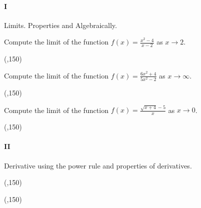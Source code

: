 
\paragraph{I} Limits. Properties and Algebraically. 

\begin{preguntas}

\pregunta[6] Compute the limit of the function \(f(x) = \frac{x^2 - 4}{x - 2}\) as $x\to2$. 

\begin{center}
    \framebox(\textwidth,150){}   
\end{center}

\pregunta[7] Compute the limit of the function \(f(x) = \frac{6x^2 + 4}{5x^2 - 2}\) as $x\to\infty$.

\begin{center}
    \framebox(\textwidth,150){} 
\end{center}

\newpage

\pregunta[7] Compute the limit of the function \(f(x) = \frac{\sqrt{x+4} - 5}{x}\) as $x\to0$.

\begin{center}
    \framebox(\textwidth,150){} 
\end{center}

\end{preguntas}


\paragraph{II} Derivative using the power rule and properties of derivatives.

\begin{preguntas}


\begin{center}
    \framebox(\textwidth,150){} 
\end{center}



\begin{center}
    \framebox(\textwidth,150){} 
\end{center}

\end{preguntas}



